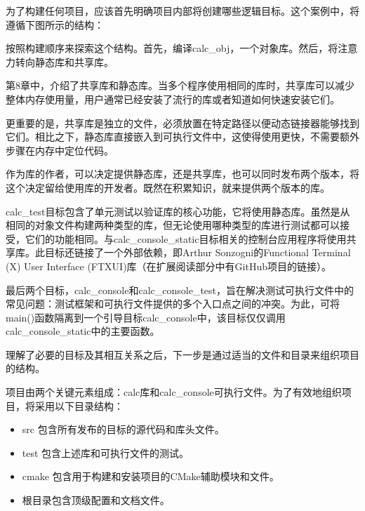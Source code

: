 
为了构建任何项目，应该首先明确项目内部将创建哪些逻辑目标。这个案例中，将遵循下图所示的结构：


按照构建顺序来探索这个结构。首先，编译calc\_obj，一个对象库。然后，将注意力转向静态库和共享库。


第8章中，介绍了共享库和静态库。当多个程序使用相同的库时，共享库可以减少整体内存使用量，用户通常已经安装了流行的库或者知道如何快速安装它们。

更重要的是，共享库是独立的文件，必须放置在特定路径以便动态链接器能够找到它们。相比之下，静态库直接嵌入到可执行文件中，这使得使用更快，不需要额外步骤在内存中定位代码。

作为库的作者，可以决定提供静态库，还是共享库，也可以同时发布两个版本，将这个决定留给使用库的开发者。既然在积累知识，就来提供两个版本的库。

calc\_test目标包含了单元测试以验证库的核心功能，它将使用静态库。虽然是从相同的对象文件构建两种类型的库，但无论使用哪种类型的库进行测试都可以接受，它们的功能相同。与calc\_console\_static目标相关的控制台应用程序将使用共享库。此目标还链接了一个外部依赖，即Arthur Sonzogni的Functional Terminal (X) User Interface (FTXUI)库（在扩展阅读部分中有GitHub项目的链接）。

最后两个目标，calc\_console和calc\_console\_test，旨在解决测试可执行文件中的常见问题：测试框架和可执行文件提供的多个入口点之间的冲突。为此，可将main()函数隔离到一个引导目标calc\_console中，该目标仅仅调用calc\_console\_static中的主要函数。

理解了必要的目标及其相互关系之后，下一步是通过适当的文件和目录来组织项目的结构。


项目由两个关键元素组成：calc库和calc\_console可执行文件。为了有效地组织项目，将采用以下目录结构：

\begin{itemize}
\item
src 包含所有发布的目标的源代码和库头文件。

\item
test 包含上述库和可执行文件的测试。

\item
cmake 包含用于构建和安装项目的CMake辅助模块和文件。

\item
根目录包含顶级配置和文档文件。
\end{itemize}

